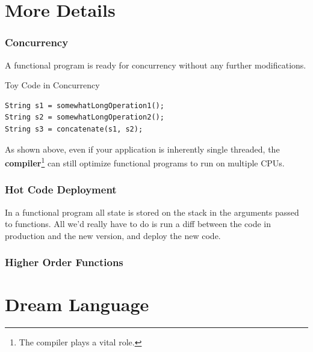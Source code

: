 \documentclass[12pt,hyperref=true,mathserif]{beamer}
\begin{document}
\section{More Details}


\begin{frame}
  \frametitle{Concurrency}
A functional program is ready for concurrency without any further
modifications.
\begin{block}{Toy Code in Concurrency}
\begin{verbatim}
String s1 = somewhatLongOperation1();
String s2 = somewhatLongOperation2();
String s3 = concatenate(s1, s2);
\end{verbatim}
\end{block}
As shown above, even if your application is inherently single
threaded, the \textbf{compiler}\footnote{The compiler plays a vital role.} can still optimize
functional programs to run on multiple CPUs.
\end{frame}

\begin{frame}
  \frametitle{Hot Code Deployment}
In a functional program all state is stored on the stack in the
arguments passed to functions. All we'd really have to do is run a
diff between the code in production and the new version, and deploy
the new code.

\end{frame}

\begin{frame}
  \frametitle{Higher Order Functions}

\end{frame}
\section{Dream Language}


\begin{frame}
% 
% 
\end{frame}
\end{document}
